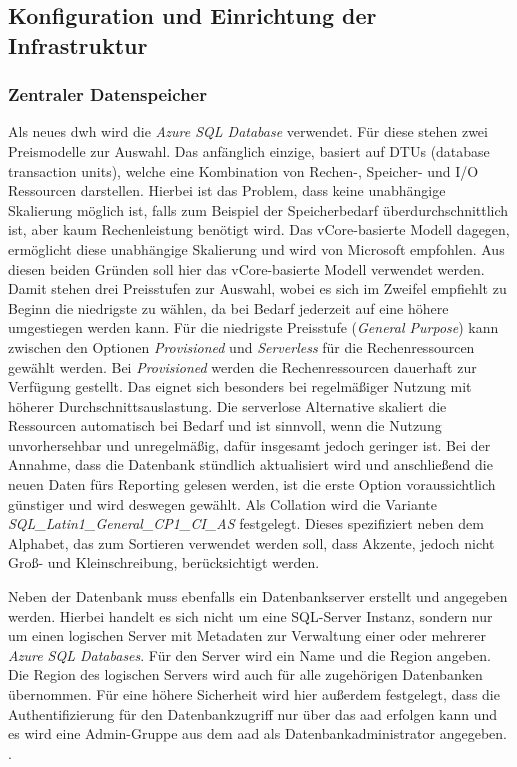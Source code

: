 \subsection{Konfiguration und Einrichtung der Infrastruktur} \label{subsec:infra:konfig}

\subsubsection{Zentraler Datenspeicher} \label{subsec:infra:konfig:datenspeicher}
Als neues \ac{dwh} wird die \textit{Azure SQL Database} verwendet. Für diese stehen zwei Preismodelle zur Auswahl. Das anfänglich einzige, basiert auf DTUs (database transaction units), welche eine Kombination von Rechen-, Speicher- und I/O Ressourcen darstellen. Hierbei ist das Problem, dass keine unabhängige Skalierung möglich ist, falls zum Beispiel der Speicherbedarf überdurchschnittlich ist, aber kaum Rechenleistung benötigt wird. Das vCore-basierte Modell dagegen, ermöglicht diese unabhängige Skalierung und wird von Microsoft empfohlen. Aus diesen beiden Gründen soll hier das vCore-basierte Modell verwendet werden. Damit stehen drei Preisstufen zur Auswahl, wobei es sich im Zweifel empfiehlt zu Beginn die niedrigste zu wählen, da bei Bedarf jederzeit auf eine höhere umgestiegen werden kann. Für die niedrigste Preisstufe (\textit{General Purpose}) kann zwischen den Optionen \textit{Provisioned} und \textit{Serverless} für die Rechenressourcen gewählt werden. Bei \textit{Provisioned} werden die Rechenressourcen dauerhaft zur Verfügung gestellt. Das eignet sich besonders bei regelmäßiger Nutzung mit höherer Durchschnittsauslastung. Die serverlose Alternative skaliert die Ressourcen automatisch bei Bedarf und ist sinnvoll, wenn die Nutzung unvorhersehbar und unregelmäßig, dafür insgesamt jedoch geringer ist. Bei der Annahme, dass die Datenbank stündlich aktualisiert wird und anschließend die neuen Daten fürs Reporting gelesen werden, ist die erste Option voraussichtlich günstiger und wird deswegen gewählt. Als Collation wird die Variante \textit{SQL{\_}Latin1{\_}General{\_}CP1{\_}CI{\_}AS} festgelegt. Dieses spezifiziert neben dem Alphabet, das zum Sortieren verwendet werden soll, dass Akzente, jedoch nicht Groß- und Kleinschreibung, berücksichtigt werden. \cite[vgl.][]{mauri_azure_2021}

Neben der Datenbank muss ebenfalls ein Datenbankserver erstellt und angegeben werden. Hierbei handelt es sich nicht um eine SQL-Server Instanz, sondern nur um einen logischen Server mit Metadaten zur Verwaltung einer oder mehrerer \textit{Azure SQL Databases}. Für den Server wird ein Name und die Region angeben. Die Region des logischen Servers wird auch für alle zugehörigen Datenbanken übernommen. Für eine höhere Sicherheit wird hier außerdem festgelegt, dass die Authentifizierung für den Datenbankzugriff nur über das \ac{aad} erfolgen kann und es wird eine Admin-Gruppe aus dem \ac{aad} als Datenbankadministrator angegeben. \cite[vgl.][]{ward_azure_2021}.


